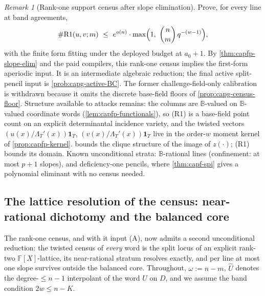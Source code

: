 \documentclass[11pt]{article}
\theoremstyle{definition}
\theoremstyle{remark}
\newtheorem{remark}[remark]{Remark}
\newcommand{\F}{\mathbb{F}}
\newcommand{\B}{\mathbb{B}}
\begin{document}
\begin{remark}[Rank-one support census after slope elimination]\label{prob:capfp-R1}
Prove, for every line at band agreements,
\[
        \#\mathrm{R1}(u,v;m)\ \le\ e^{o(n)}\cdot\max\Bigl(1,\ \binom nm\,q^{-(w-1)}\Bigr),
\]
with the finite form fitting under the deployed budget at $a_0+1$.  By \cref{thm:capfp-slope-elim} and the paid compilers, this rank-one census implies the first-form aperiodic input.  It is an intermediate algebraic reduction; the final active split-pencil input is \cref{prob:capg-active-BC}.  The former challenge-field-only calibration is withdrawn because it omits the discrete base-field floors of \cref{prop:capg-census-floor}.  Structure available to attacks remains: the columns are $\B$-valued on $\B$-valued coordinate words (\cref{lem:capfp-functionals}), so \textup{(R1)} is a base-field point count on an explicit determinantal incidence variety, and the twisted vectors $(u(x)/\Lambda_T'(x))\mathbf1_T$, $(v(x)/\Lambda_T'(x))\mathbf1_T$ live in the order-$w$ moment kernel of \cref{prop:capfp-kernel}.   bounds the clique structure of the image of $z(\cdot)$; \textup{(R1)} bounds its domain.  Known unconditional strata: $\B$-rational lines \textup(confinement: at most $p+1$ slopes\textup), and deficiency-one pencils, where \cref{thm:capf-spi} gives a polynomial eliminant with no census needed.
\end{remark}

\subsection{The lattice resolution of the census: near-rational dichotomy and the balanced core}

The rank-one census, and with it input \textup{(A)}, now admits a second unconditional reduction: the twisted census of \emph{every} word is the split locus of an explicit rank-two $\F[X]$-lattice, its near-rational stratum resolves exactly, and per line at most one slope survives outside the balanced core.  Throughout, $\omega:=n-m$, $\widehat U$ denotes the degree-$\le n-1$ interpolant of the word $U$ on $D$, and we assume the band condition $2w\le n-K$.
\end{document}
